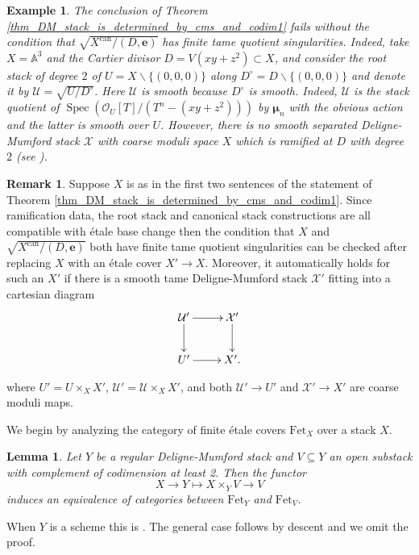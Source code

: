 \documentclass{amsart}
\newcommand{\cU}{\mathcal{U}}
\newcommand{\cX}{\mathcal{X}}
\newcommand{\spec}{\operatorname{Spec}}
\newcommand{\bmu}{\bm{\mu}}
\newtheorem{Lemma}[theorem]{Lemma}
\newtheorem{example}[theorem]{Example}
\theoremstyle{definition}
\newtheorem{Remark}[theorem]{Remark}
\begin{document}
 
 \begin{example}
     The conclusion of Theorem \ref{thm_DM_stack_is_determined_by_cms_and_codim1} fails without the condition that $\sqrt{X^{\mathrm{can}}/(D,\mathbf{e})}$ has finite tame quotient singularities. Indeed, take $X=\mathbb{A}^3$ and the Cartier divisor $D=V(xy+z^2) \subset X$, and consider the root stack of degree $2$ of $U=X\smallsetminus\{(0,0,0)\}$ along $D^{\circ}=D \smallsetminus \{(0,0,0)\}$ and denote it by $\mathcal{U}=\sqrt{U/D^{\circ}}$. Here $\mathcal{U}$ is smooth because $D^{\circ}$ is smooth. Indeed, $\mathcal{U}$ is the stack quotient of $\spec (\mathcal{O}_U[T]/(T^n-(xy+z^2)))$ by $\bmu_n$ with the obvious action and the latter is smooth over $U$. However, there is no smooth separated Deligne-Mumford stack $\cX$ with coarse moduli space $X$ which is ramified at $D$ with degree $2$ (see \cite[Ex. 7]{GS17}). \end{example}


 \begin{Remark} \label{rem:etloccheck} Suppose $X$ is as in the first two sentences of the statement of Theorem \ref{thm_DM_stack_is_determined_by_cms_and_codim1}.  Since ramification data, the root stack and canonical stack constructions are all compatible with \'etale base change then the condition that $X$ and $\sqrt{X^{\mathrm{can}}/(D,\mathbf{e})}$ both have finite tame quotient singularities can be checked after replacing $X$ with an \'etale cover $X' \to X$. Moreover, it automatically holds for such an $X'$ if there is a smooth tame Deligne-Mumford stack $\cX'$ fitting into a cartesian diagram
 $$\xymatrix{\cU'\ar[r] \ar[d] & \cX' \ar[d] \\ U'\ar[r] & X'.}$$

\noindent where $U'=U \times_{X} X'$, $\cU'=\cU \times_{X} X'$, and both $\cU' \to U'$ and $\cX' \to X'$ are coarse moduli maps. 
 
 \end{Remark}
 
 We begin by analyzing the category of finite \'etale covers $\mathrm{Fet}_X$ over a stack $X$.
\begin{Lemma}\label{lemma_fet_equivalence}
    Let $Y$ be a regular Deligne-Mumford stack and $V\subseteq Y$ an open substack with complement of codimension at least 2. Then the functor 
    \[X \to Y \mapsto X \times_Y V \to V\]
    induces an equivalence of categories between $\mathrm{Fet}_Y$ and $ \mathrm{Fet}_V$.
\end{Lemma} 
When $Y$ is a scheme this is  \cite[Exp. 10, Cor. 3.3]{zbMATH01992950}. The general case follows by descent and we omit the proof.
\end{document}
